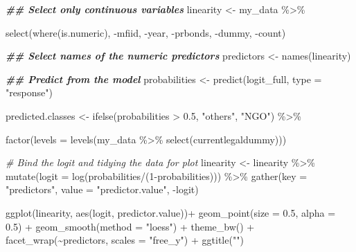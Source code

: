 \documentclass[a4paper,nobind]{templates/ociamthesis}
\newenvironment{Shaded}{\begin{snugshade}}{\end{snugshade}}
\newcommand{\AttributeTok}[1]{\textcolor[rgb]{0.77,0.63,0.00}{#1}}
\newcommand{\CommentTok}[1]{\textcolor[rgb]{0.56,0.35,0.01}{\textit{#1}}}
\newcommand{\DecValTok}[1]{\textcolor[rgb]{0.00,0.00,0.81}{#1}}
\newcommand{\DocumentationTok}[1]{\textcolor[rgb]{0.56,0.35,0.01}{\textbf{\textit{#1}}}}
\newcommand{\FloatTok}[1]{\textcolor[rgb]{0.00,0.00,0.81}{#1}}
\newcommand{\FunctionTok}[1]{\textcolor[rgb]{0.00,0.00,0.00}{#1}}
\newcommand{\NormalTok}[1]{#1}
\newcommand{\OtherTok}[1]{\textcolor[rgb]{0.56,0.35,0.01}{#1}}
\newcommand{\SpecialCharTok}[1]{\textcolor[rgb]{0.00,0.00,0.00}{#1}}
\newcommand{\StringTok}[1]{\textcolor[rgb]{0.31,0.60,0.02}{#1}}
\renewenvironment{Shaded}
{
  \vspace{10pt}%
  \begin{snugshade}%
}{%
  \end{snugshade}%
  \vspace{8pt}%
}
\begin{document}
\begin{Shaded}
\begin{Highlighting}[]
\DocumentationTok{\#\# Select only continuous variables}
\NormalTok{linearity }\OtherTok{\textless{}{-}}\NormalTok{ my\_data }\SpecialCharTok{\%\textgreater{}\%} 
  
  \FunctionTok{select}\NormalTok{(}\FunctionTok{where}\NormalTok{(is.numeric), }\SpecialCharTok{{-}}\NormalTok{mfiid, }\SpecialCharTok{{-}}\NormalTok{year, }\SpecialCharTok{{-}}\NormalTok{prbonds, }\SpecialCharTok{{-}}\NormalTok{dummy, }\SpecialCharTok{{-}}\NormalTok{count)}

\DocumentationTok{\#\# Select names of the numeric predictors}
\NormalTok{predictors }\OtherTok{\textless{}{-}} \FunctionTok{names}\NormalTok{(linearity)}

\DocumentationTok{\#\# Predict from the model}
\NormalTok{probabilities }\OtherTok{\textless{}{-}} \FunctionTok{predict}\NormalTok{(logit\_full, }\AttributeTok{type =} \StringTok{"response"}\NormalTok{)}

\NormalTok{predicted.classes }\OtherTok{\textless{}{-}} \FunctionTok{ifelse}\NormalTok{(probabilities }\SpecialCharTok{\textgreater{}} \FloatTok{0.5}\NormalTok{, }\StringTok{"others"}\NormalTok{, }\StringTok{"NGO"}\NormalTok{) }\SpecialCharTok{\%\textgreater{}\%} 
  
  \FunctionTok{factor}\NormalTok{(}\AttributeTok{levels =} \FunctionTok{levels}\NormalTok{(my\_data }\SpecialCharTok{\%\textgreater{}\%} \FunctionTok{select}\NormalTok{(currentlegaldummy)))}

\CommentTok{\# Bind the logit and tidying the data for plot}
\NormalTok{linearity }\OtherTok{\textless{}{-}}\NormalTok{ linearity }\SpecialCharTok{\%\textgreater{}\%}
  \FunctionTok{mutate}\NormalTok{(}\AttributeTok{logit =} \FunctionTok{log}\NormalTok{(probabilities}\SpecialCharTok{/}\NormalTok{(}\DecValTok{1}\SpecialCharTok{{-}}\NormalTok{probabilities))) }\SpecialCharTok{\%\textgreater{}\%}
  \FunctionTok{gather}\NormalTok{(}\AttributeTok{key =} \StringTok{"predictors"}\NormalTok{, }\AttributeTok{value =} \StringTok{"predictor.value"}\NormalTok{, }\SpecialCharTok{{-}}\NormalTok{logit)}

\FunctionTok{ggplot}\NormalTok{(linearity, }\FunctionTok{aes}\NormalTok{(logit, predictor.value))}\SpecialCharTok{+}
  \FunctionTok{geom\_point}\NormalTok{(}\AttributeTok{size =} \FloatTok{0.5}\NormalTok{, }\AttributeTok{alpha =} \FloatTok{0.5}\NormalTok{) }\SpecialCharTok{+}
  \FunctionTok{geom\_smooth}\NormalTok{(}\AttributeTok{method =} \StringTok{"loess"}\NormalTok{) }\SpecialCharTok{+} 
  \FunctionTok{theme\_bw}\NormalTok{() }\SpecialCharTok{+} 
  \FunctionTok{facet\_wrap}\NormalTok{(}\SpecialCharTok{\textasciitilde{}}\NormalTok{predictors, }\AttributeTok{scales =} \StringTok{"free\_y"}\NormalTok{) }\SpecialCharTok{+} 
  \FunctionTok{ggtitle}\NormalTok{(}\StringTok{""}\NormalTok{)}
\end{Highlighting}
\end{Shaded}
\end{document}
